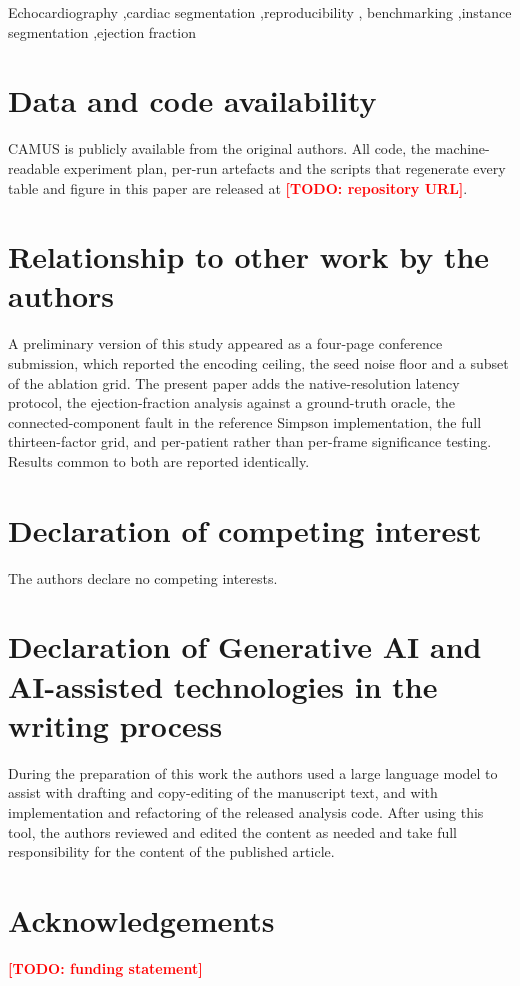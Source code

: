 \documentclass[review,1p,times]{elsarticle}
\newcommand{\TODO}[1]{\textcolor{red}{\textbf{[TODO: #1]}}}
\begin{document}
\begin{frontmatter}
\begin{keyword}
Echocardiography \sep cardiac segmentation \sep reproducibility \sep
benchmarking \sep instance segmentation \sep ejection fraction
\end{keyword}

\end{frontmatter}








\section*{Data and code availability}
CAMUS is publicly available from the original authors. All code, the
machine-readable experiment plan, per-run artefacts and the scripts that
regenerate every table and figure in this paper are released at
\TODO{repository URL}.

\section*{Relationship to other work by the authors}
A preliminary version of this study appeared as a four-page conference
submission, which reported the encoding ceiling, the seed noise floor and a
subset of the ablation grid. The present paper adds the native-resolution
latency protocol, the ejection-fraction analysis against a ground-truth oracle,
the connected-component fault in the reference Simpson implementation, the full
thirteen-factor grid, and per-patient rather than per-frame significance
testing. Results common to both are reported identically.

\section*{Declaration of competing interest}
The authors declare no competing interests.

\section*{Declaration of Generative AI and AI-assisted technologies in the
writing process}
During the preparation of this work the authors used a large language model to
assist with drafting and copy-editing of the manuscript text, and with
implementation and refactoring of the released analysis code. After using this
tool, the authors reviewed and edited the content as needed and take full
responsibility for the content of the published article.

\section*{Acknowledgements}
\TODO{funding statement}


\end{document}
